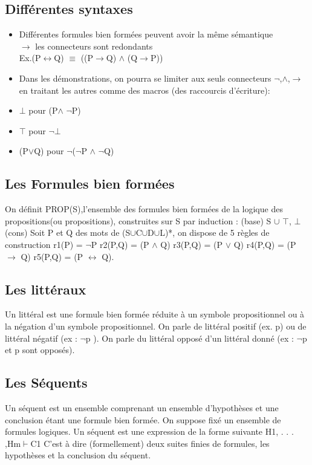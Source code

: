 \documentclass[a4paper,12pt]{article}
\begin{document}
\subsection{Différentes syntaxes}
\begin{itemize}
 \item Différentes formules bien formées peuvent avoir la même sémantique\\
 $\rightarrow$  les connecteurs sont redondants\\
 Ex.(P$\leftrightarrow$Q) $\equiv$ ((P$\rightarrow$Q) $\wedge$ (Q$\rightarrow$P))
 \item Dans les démonstrations, on pourra se limiter aux seuls connecteurs $\neg$,$\wedge$,$\rightarrow$ en traitant les autres
 comme des macros (des raccourcis d'écriture):
 \item $\bot$ pour (P$\wedge$ $\neg$P)
 \item $\top$ pour $\neg\bot$
 \item (P$\vee$Q) pour $\neg$($\neg$P $\wedge$ $\neg$Q)

\end{itemize}

\subsection{Les Formules bien formées}

On définit PROP(S),l'ensemble des formules bien formées de la logique des propositions(ou propositions), construites sur S par induction : (base) S $\cup$ {$\top$, $\bot$}(cons)  
Soit P et Q des mots de (S$\cup$C$\cup$D$\cup$L)*, on dispose de 5 règles de construction 
r1(P) = $\neg$P 
r2(P,Q) = (P $\wedge$ Q)  
r3(P,Q) = (P $\vee$ Q) 
r4(P,Q) = (P $\rightarrow$ Q) 
r5(P,Q) = (P $\leftrightarrow$ Q).


\subsection{Les littéraux}

Un littéral est une formule bien formée réduite à un symbole propositionnel ou à la négation d'un symbole propositionnel. 
On parle de littéral positif (ex. p) ou de littéral négatif (ex : $\neg$p ).
On parle du littéral opposé d'un littéral donné (ex : $\neg$p et p sont opposés).

\subsection{Les Séquents}
Un séquent est un ensemble comprenant un ensemble d'hypothèses et une conclusion étant une formule bien formée.
On suppose fixé un ensemble de formules logiques. Un séquent est une expression de la forme suivante
H1, . . . ,Hm$\vdash$C1
C’est à dire (formellement) deux suites finies de formules, les hypothèses et la conclusion du séquent.
\end{document}
